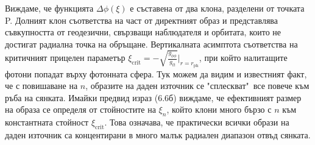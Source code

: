 \begin{minipage}{16em}
	Виждаме, че функцията $\Delta\phi(\xi)$ е съставена от два клона, разделени от точката P. Долният клон съответства на част от директният образ и представлява съвкупността от геодезични, свързващи наблюдателя и орбитата, които не достигат радиална точка на обръщане. Вертикалната асимптота съответства на критичният прицелен параметър $\xi_\text{crit} = -\sqrt{\frac{g_{\phi\phi}}{g_{tt}}}\big\vert_{r = r_\text{ph}}$, при който налитащите фотони попадат върху фотонната сфера. Тук можем да видим и известният факт, че с повишаване на $n$, образите на даден източник се "сплескват"$\,$ все повече към ръба на сянката. Имайки предвид израз (6.6б) виждаме, че ефективният размер на образа се определя от стойностите на $\xi_n$, който клони много бързо с $n$ към константната стойност $\xi_\text{crit}$. Това означава, че практически всички образи на даден източник са концентирани в много малък радиален диапазон отвъд сянката.
\end{minipage}\\

